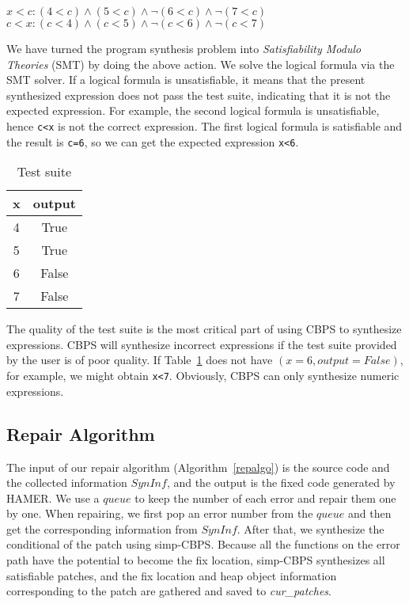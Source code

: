 \documentclass[a4paper,11pt,oneside,openany]{book}
\begin{document}
\begin{minipage}{\textwidth}
    \vspace{0.2cm}
    \textsl{\hspace{0.3cm}$x<c: (4<c)\wedge(5<c)\wedge\neg(6<c)\wedge\neg(7<c)$\\\hspace{0.3cm}$c<x: (c<4)\wedge(c<5)\wedge\neg(c<6)\wedge\neg(c<7)$\\}
\end{minipage}
We have turned the program synthesis problem into {\it Satisfiability Modulo Theories} (SMT) by doing the above action. We solve the logical formula via the SMT solver. If a logical formula is unsatisfiable, it means that the present synthesized expression does not pass the test suite, indicating that it is not the expected expression. For example, the second logical formula is unsatisfiable, hence \verb|c<x| is not the correct expression. The first logical formula is satisfiable and the result is \verb|c=6|, so we can get the expected expression \verb|x<6|.


\begin{table}[h]
  \caption{Test suite}
  \label{test}
  \centering
  \begin{tabular}{|c|c|}
    \hline
     x & output \\
    \hline
     4 & True \\
     5 & True \\
     6 & False \\
     7 & False \\
    \hline
  \end{tabular}
\end{table}

The quality of the test suite is the most critical part of using CBPS to synthesize expressions. CBPS will synthesize incorrect expressions if the test suite provided by the user is of poor quality. If Table~\ref{test} does not have $(x=6, output=False)$, for example, we might obtain \verb|x<7|. Obviously, CBPS can only synthesize numeric expressions.


\subsection{Repair Algorithm}
The input of our repair algorithm (Algorithm~\ref{repalgo}) is the source code and the collected information $SynInf$, and the output is the fixed code generated by HAMER. We use a $queue$ to keep the number of each error and repair them one by one. When repairing, we first pop an error number from the $queue$ and then get the corresponding information from $SynInf$. After that, we synthesize the conditional of the patch using simp-CBPS. Because all the functions on the error path have the potential to become the fix location, simp-CBPS synthesizes all satisfiable patches, and the fix location and heap object information corresponding to the patch are gathered and saved to {\it cur\_patches}.
\end{document}
